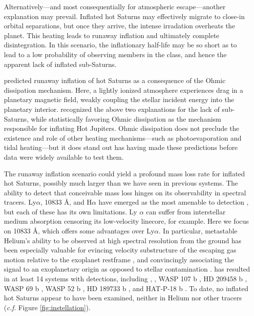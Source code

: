 \documentclass[twocolumn]{aastex631}
\begin{document}
Alternatively---and most consequentially for atmospheric escape---another explanation may prevail.  Inflated hot Saturns may effectively migrate to close-in orbital separations, but once they arrive, the intense irradation overheats the planet.  This heating leads to runaway inflation and ultimately complete disintegration.  In this scenario, the inflationary half-life may be so short as to lead to a low probability of observing members in the class, and hence the apparent lack of inflated sub-Saturns.

\citet{2011ApJ...738....1B} predicted runaway inflation of hot Saturns as a consequence of the Ohmic dissipation mechanism.  Here, a lightly ionized atmosphere experiences drag in a planetary magnetic field, weakly coupling the stellar incident energy into the planetary interior.  \citet{2018AJ....155..214T} recognized the above two explanations for the lack of sub-Saturns, while statistically favoring Ohmic dissipation as the mechanism responsible for inflating Hot Jupiters.  Ohmic dissipation does not preclude the existence and role of other heating mechanisms---such as photoevaporation and tidal heating---but it does stand out has having made these predictions before data were widely available to test them.

The runaway inflation scenario could yield a profound mass loss rate for inflated hot Saturns, possibly much larger than we have seen in previous systems.  The ability to detect that conceivable mass loss hinges on its observability in spectral tracers.  Ly$\alpha$,  10833 \AA, and H$\alpha$ have emerged as the most amenable to detection \citep{2018ApJ...855L..11O,2023MNRAS.518.4357O}, but each of these has its own limitations.  Ly $\alpha$ can suffer from interstellar medium  absorption censoring its low-velocity linecore, for example.  Here we focus on  10833 \AA, which offers some advantages over Ly$\alpha$.  In particular, metastable Helium's ability to be observed at high spectral resolution from the ground has been especially valuable for evincing velocity substructure of the escaping gas motion relative to the exoplanet restframe \citep{2019A&A...629A.110A,2020ApJ...894...97N}, and convincingly associating the signal to an exoplanetary origin as opposed to stellar contamination \citep{2018AJ....156..189C}.   has resulted in at least 14 systems with detections, including  \citep{2020ApJ...894...97N, 2021A&A...647A.129L},  \citep{2022AJ....163...68Z}, WASP 107 b \citep{2019A&A...623A..58A,2020AJ....159..115K}, HD 209458 b \citep{2019A&A...629A.110A}, WASP 69 b \citep{2020AJ....159..278V}, WASP 52 b \citep{2020AJ....159..278V}, HD 189733 b \citep{2021A&A...647A.129L}, and HAT-P-18 b \citep{2021ApJ...909L..10P}.  To date, no inflated hot Saturns appear to have been examined, neither in Helium nor other tracers (\emph{c.f.} Figure \ref{fig:instellation}).
\end{document}
